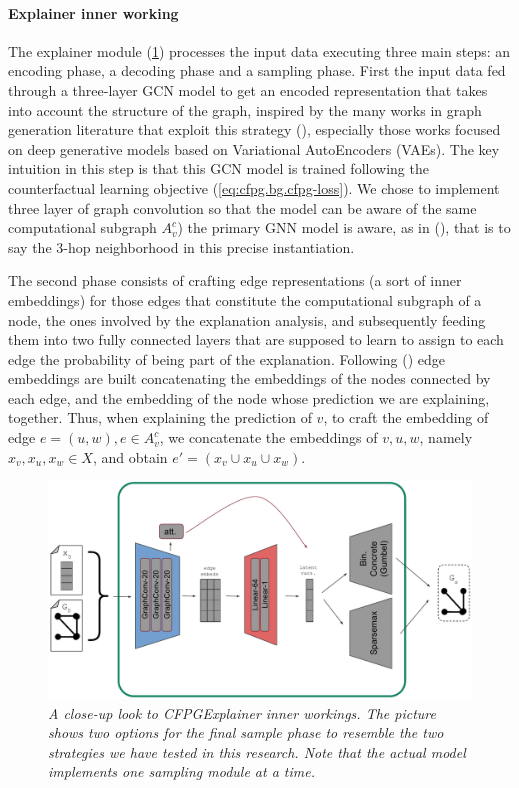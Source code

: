 \documentclass[binding=0.6cm]{sapthesis}
\newcommand{\mycite}[1]{(\cite{#1})}
\begin{document}
\paragraph{Explainer inner working}
\label{sec:cfpg.my.cfpg-inner}
The explainer module (\cref{fig:cfpg.my.cfpg-inner}) processes the input data executing three main steps: an encoding phase, a decoding phase and a sampling phase. First the input data fed through a three-layer GCN model to get an encoded representation that takes into account the structure of the graph, inspired by the many works in graph generation literature that exploit this strategy \mycite{zhu2022-survey-generation}, especially those works focused on deep generative models based on Variational AutoEncoders (VAEs). The key intuition in this step is that this  GCN model is trained following the counterfactual learning objective (\cref{eq:cfpg.bg.cfpg-loss}). We chose to implement three layer of graph convolution so that the  model can be aware of the same computational subgraph $A^c_v$) the primary GNN model is aware, as in \mycite{ying2019-gnnexplainer}, that is to say the 3-hop neighborhood in this precise instantiation.

The second phase consists of crafting edge representations (a sort of inner embeddings) for those edges that constitute the computational subgraph of a node, the ones involved by the explanation analysis, and subsequently feeding them into two fully connected layers that are supposed to learn to assign to each edge the probability of being part of the explanation. Following \mycite{luo2020-pgexplainer} edge embeddings are built concatenating the embeddings of the nodes connected by each edge, and the embedding of the node whose prediction we are explaining, together. Thus, when explaining the prediction of $v$, to craft the embedding of edge $e = (u,w), e \in A^c_v$, we concatenate the embeddings of $v,u,w$, namely $x_v,x_u,x_w \in X$, and obtain $e' = (x_v \cup x_u \cup x_w)$.
\begin{figure}[h]
    \centering
    \includegraphics[width=\textwidth]{imgs/cfpg/cfpg-schema-fake.png}
    \caption{\textit{A close-up look to CFPGExplainer inner workings. The picture shows two options for the final sample phase to resemble the two strategies we have tested in this research. Note that the actual model implements one sampling module at a time.}}
    \label{fig:cfpg.my.cfpg-inner}
\end{figure}
\end{document}
